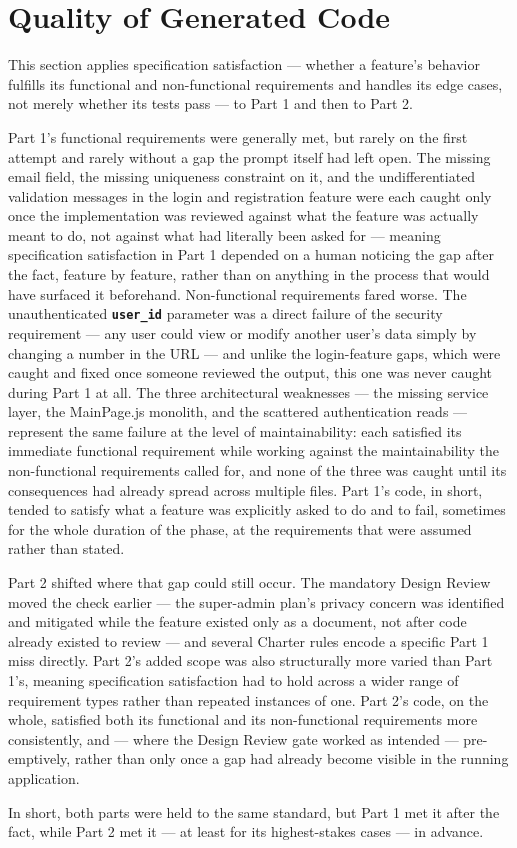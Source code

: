\section{Quality of Generated Code}

This section applies specification satisfaction --- whether a feature's behavior fulfills its functional and non-functional requirements and handles its edge cases, not merely whether its tests pass --- to Part 1 and then to Part 2.

Part 1's functional requirements were generally met, but rarely on the first attempt and rarely without a gap the prompt itself had left open. The missing email field, the missing uniqueness constraint on it, and the undifferentiated validation messages in the login and registration feature were each caught only once the implementation was reviewed against what the feature was actually meant to do, not against what had literally been asked for --- meaning specification satisfaction in Part 1 depended on a human noticing the gap after the fact, feature by feature, rather than on anything in the process that would have surfaced it beforehand. Non-functional requirements fared worse. The unauthenticated \textbf{\texttt{user\_id}} parameter was a direct failure of the security requirement --- any user could view or modify another user's data simply by changing a number in the URL --- and unlike the login-feature gaps, which were caught and fixed once someone reviewed the output, this one was never caught during Part 1 at all. The three architectural weaknesses --- the missing service layer, the MainPage.js monolith, and the scattered authentication reads --- represent the same failure at the level of maintainability: each satisfied its immediate functional requirement while working against the maintainability the non-functional requirements called for, and none of the three was caught until its consequences had already spread across multiple files. Part 1's code, in short, tended to satisfy what a feature was explicitly asked to do and to fail, sometimes for the whole duration of the phase, at the requirements that were assumed rather than stated.

Part 2 shifted where that gap could still occur. The mandatory Design Review moved the check earlier --- the super-admin plan's privacy concern was identified and mitigated while the feature existed only as a document, not after code already existed to review --- and several Charter rules encode a specific Part 1 miss directly. Part 2's added scope was also structurally more varied than Part 1's, meaning specification satisfaction had to hold across a wider range of requirement types rather than repeated instances of one. Part 2's code, on the whole, satisfied both its functional and its non-functional requirements more consistently, and --- where the Design Review gate worked as intended --- pre-emptively, rather than only once a gap had already become visible in the running application.

In short, both parts were held to the same standard, but Part 1 met it after the fact, while Part 2 met it --- at least for its highest-stakes cases --- in advance.

